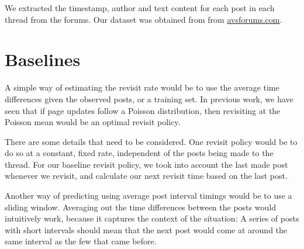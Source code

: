 We extracted the timestamp, author and text content for each post in each thread
from the forums. Our dataset was obtained from from \url{avsforums.com}.
%
%

\section{Baselines}
A simple way of estimating the revisit rate would be to use the average time 
differences given the observed posts, or a training set. In previous work, we 
have seen that if page updates follow a Poisson distribution, then revisiting at 
the Poisson mean would be an optimal revisit policy. %

There are some details that need to be considered. One revisit policy would be 
to do so at a constant, fixed rate, independent of the posts being made to the 
thread. 
For our baseline revisit policy, we took into account the last made post 
whenever we revisit, and calculate our next revisit time based on the last post.

Another way of predicting using average post interval timings would be to use a 
sliding window. Averaging out the time differences between the posts would 
intuitively work, because it captures the context of the situation: A series of 
posts with short intervals should mean that the next post would come at around 
the same interval as the few that came before.


